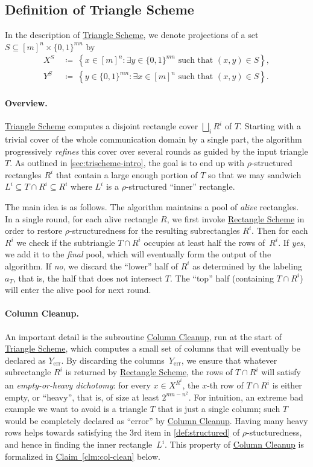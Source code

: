 \documentclass[11pt]{article}
\numberwithin{equation}{section}
\theoremstyle{definition}
\theoremstyle{plain}
\newcommand{\expref}[2]{\hyperref[#2]{#1~\ref{#2}}}
\newcommand{\rectscheme}{\hyperref[alg:partition]{Rectangle Scheme}\xspace}
\newcommand{\trischeme}{\hyperref[alg:tri-partition]{Triangle Scheme}\xspace}
\newcommand{\columnclean}{\hyperref[alg:column-cleanup]{Column Cleanup}\xspace}
\DeclareMathOperator{\err}{err}
\newcommand{\allX}{[m]^n}
\newcommand{\allY}{\{0,1\}^{mn}}
\newcommand{\set}[1]{\left \{ #1 \right \}}
\begin{document}
\subsection{Definition of Triangle Scheme} \label{sec:proof-tri-partition}

In the description of \trischeme, we denote projections of a set $S \subseteq \allX \times \allY$ by
\begin{align*}
X^S~&\coloneqq~\set{x \in \allX : \exists y \in \allY \text{ such that } (x,y) \in S},\\
Y^S~&\coloneqq~\set{y \in \allY : \exists x \in \allX \text{ such that } (x,y) \in S}.
\end{align*}
\paragraph{Overview.}
\trischeme computes a disjoint rectangle cover $\bigsqcup_i R^i$ of $T$. 
Starting with a trivial cover of the whole communication domain by a single part, the algorithm progressively \emph{refines} this cover over several rounds as guided by the input triangle $T$. As outlined in \autoref{sec:trischeme-intro}, the goal is to end up with $\rho$-structured rectangles $R^i$ that contain a large enough portion of $T$ so that we may sandwich $L^i\subseteq T\cap R^i\subseteq R^i$ where $L^i$ is a $\rho$-structured ``inner'' rectangle.

The main idea is as follows. The algorithm maintains a pool of \emph{alive} rectangles. In a single round, for each alive rectangle $R$, we first invoke \rectscheme in order to restore $\rho$-structuredness for the resulting subrectangles $R^i$. Then for each $R^i$ we check if the subtriangle $T\cap R^i$ occupies at least half the rows of~$R^i$. If \emph{yes}, we add it to the \emph{final} pool, which will eventually form the output of the algorithm. If \emph{no}, we discard the ``lower'' half of $R^i$ as determined by the labeling $a_T$, that is, the half that does not intersect $T$. The ``top'' half (containing $T\cap R^i$) will enter the alive pool for next round.

\paragraph{Column Cleanup.}
An important detail is the subroutine \columnclean, run at the start of \trischeme, which computes a small set of columns that will eventually be declared as $Y_{\err}$. By discarding the columns~$Y_{\err}$, we ensure that whatever subrectangle $R^i$ is
returned %
by \rectscheme, the rows of $T\cap R^i$ will satisfy an \emph{empty-or-heavy dichotomy}: for every $x\in X^{R^i}$, the $x$-th row of $T\cap R^i$ is either empty, or ``heavy'', that is, of size at least $2^{mn-n^2}$. For intuition, an extreme bad example we want to avoid is a triangle $T$ that is just a single column; such $T$ would be completely declared as ``error'' by \columnclean. Having many heavy rows helps towards satisfying the 3rd item in \autoref{def:structured} of $\rho$-stucturedness, and hence in finding the inner rectangle~$L^i$. This property of \columnclean is formalized in \expref{Claim}{clm:col-clean} below.
\end{document}
